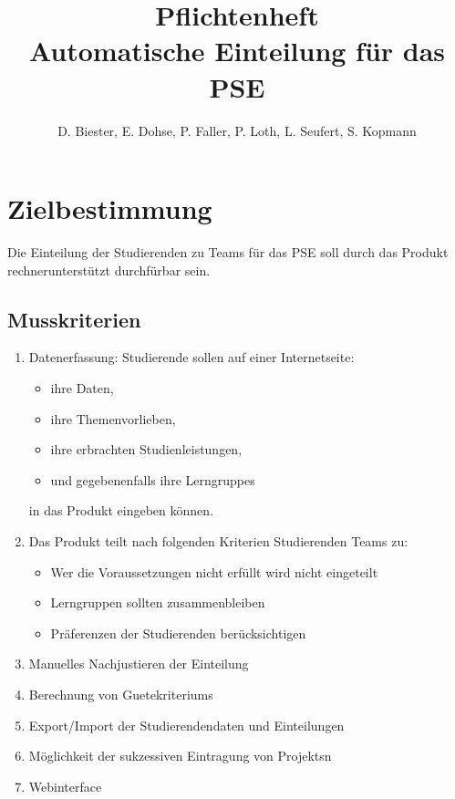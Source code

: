 \documentclass[parskip=full]{scrartcl}
\newcommand{\swtLabel}[1]{\textbf{\textbackslash #1\arabic*0\textbackslash}}
\begin{document}
\title{Pflichtenheft \\
        \large Automatische Einteilung für das PSE}

\author{D. Biester, E. Dohse, P. Faller, P. Loth, L. Seufert, S. Kopmann}
        
\maketitle
 
\pagebreak
\tableofcontents
\pagebreak

\section{Zielbestimmung}
Die Einteilung der Studierenden zu Teams für das \gls{PSE} soll durch das Produkt
rechnerunterstützt durchfürbar sein.


\subsection{Musskriterien}
 \begin{enumerate}[label=\swtLabel{M}]
   \item Datenerfassung: Studierende sollen auf einer Internetseite:   
   \begin{itemize}
     \item ihre Daten, %
     \item ihre Themenvorlieben, 
     \item ihre erbrachten Studienleistungen,
     \item und gegebenenfalls ihre \glspl{Lerngruppe}
   \end{itemize}
   in das Produkt eingeben können.
   \item Das Produkt teilt nach folgenden Kriterien Studierenden Teams zu:
   \begin{itemize}
     \item Wer die Voraussetzungen nicht erfüllt wird nicht eingeteilt
     \item Lerngruppen sollten zusammenbleiben
     \item Präferenzen der Studierenden berücksichtigen
   \end{itemize}
   
   \item Manuelles Nachjustieren der Einteilung
   \item Berechnung von \glspl{Guetekriterium}
   \item Export/Import der Studierendendaten und
   Einteilungen %
   \item Möglichkeit der sukzessiven Eintragung von \glspl{Projekt}n
   \item Webinterface   
 \end{enumerate}
\end{document}
